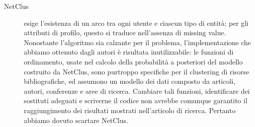 \begin{description}
\item[NetClus] esige l'esistenza di un arco tra ogni utente e ciascun tipo di entit\`a; per gli attributi di profilo, questo si traduce nell'assenza di missing value. Nonostante l'algoritmo sia calzante per il problema, l'implementazione che abbiamo ottenuto dagli autori \`e risultata inutilizzabile: le funzioni di ordinamento, usate nel calcolo della probabilit\`a a posteriori del modello costruito da NetClus, sono purtroppo specifiche per il clustering di risorse bibliografiche, ed assumono un modello dei dati composto da articoli, autori, conferenze e aree di ricerca. Cambiare tali funzioni, identificare dei sostituti adeguati e scriverne il codice non avrebbe comunque garantito il raggiungimento dei risultati mostrati nell'articolo di ricerca. Pertanto abbiamo dovuto scartare NetClus.


\end{description}

